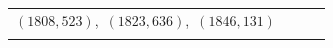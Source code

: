 \documentclass[11pt]{article}
\begin{document}
\begin{longtable}{@{}rrl>{\raggedright\arraybackslash}p{}@{}}
$(1808,523)$,\allowbreak\ $(1823,636)$,\allowbreak\ $(1846,131)$\\
\addlinespace[3pt]
\end{longtable}
\endgroup
\end{document}
